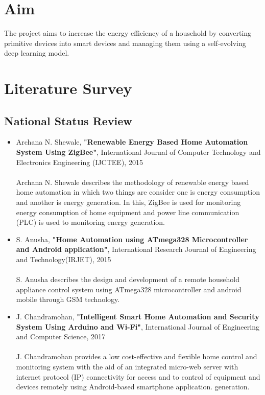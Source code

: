 \documentclass[12pt,a4paper,titlepage,twoside]{article}
\begin{document}
        \section{Aim}
            The project aims to increase the energy efficiency of a household by converting primitive devices into smart devices and managing them using a self-evolving deep learning model.
        
        \section{Literature Survey}
            \subsection{National Status Review}
            \begin{itemize}
                \item Archana N. Shewale, \textbf{"Renewable Energy Based Home Automation System Using ZigBee"}, International Journal of Computer Technology and Electronics Engineering (IJCTEE), 2015\\ \\
                Archana N. Shewale describes the methodology of renewable energy based home automation in which two things are consider one is energy consumption and another is energy generation. In this, ZigBee is used for monitoring energy consumption of home equipment and power line communication (PLC) is used to monitoring energy generation.
                \item S. Anusha, \textbf{"Home Automation using ATmega328 Microcontroller and Android application"}, International Research Journal of Engineering and Technology(IRJET), 2015\\ \\
                S. Anusha describes the design and development of a remote household appliance control system using ATmega328 microcontroller and android mobile through GSM technology.
                \item J. Chandramohan, \textbf{"Intelligent Smart Home Automation and Security System Using Arduino and Wi-Fi"}, International Journal of Engineering and Computer Science, 2017\\ \\
                J. Chandramohan provides a low cost-effective and flexible home control and monitoring system with the aid of an integrated micro-web server with internet protocol (IP) connectivity for access and to control of equipment and devices remotely using Android-based smartphone application. generation.
            \end{itemize}
\end{document}
